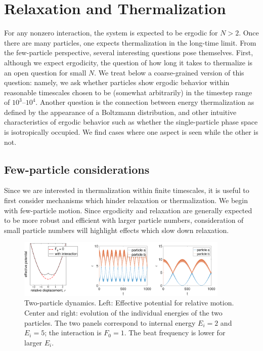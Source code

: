 \documentclass[a4paper, onecolumn]{revtex4-1}
\begin{document}
\section{Relaxation and Thermalization}\label{sec:relaxation}


For any nonzero interaction, the system is expected to be ergodic for $N>2$.  Once there are many
particles, one expects thermalization in the long-time limit.  From the few-particle perspective,
several interesting questions pose themselves.  First, although we expect ergodicity, the question
of how long it takes to thermalize is an open question for small $N$. We treat below a
coarse-grained version of this question: namely, we ask whether particles show ergodic behavior
within reasonable timescales chosen to be (somewhat arbitrarily) in the timestep range of
$10^3$--$10^4$.  Another question is the connection between energy thermalization as defined by the
appearance of a Boltzmann distribution, and other intuitive characteristics of ergodic behavior such
as whether the single-particle phase space is isotropically occupied.  We find cases where one
aspect is seen while the other is not.







\subsection{Few-particle considerations}

Since we are interested in thermalization within finite timescales, it is useful to first consider
mechanisms which hinder relaxation or thermalization.  We begin with few-particle motion.  Since
ergodicity and relaxation are generally expected to be more robust and efficient with larger
particle numbers, consideration of small particle numbers will highlight effects which slow down
relaxation.



\begin{figure}[tb]
\centering
\includegraphics[width=0.9\textwidth]{two_particles_a_01.pdf}
\caption{Two-particle dynamics.  Left: Effective potential for relative motion.  Center and right:
  evolution of the individual energies of the two particles.  The two panels correspond to internal
  energy $E_i=2$ and $E_i=5$; the interaction is $F_0=1$.  The beat frequency is lower for larger
  $E_i$. }
\label{fig:thermalization2}
\end{figure}
\end{document}
